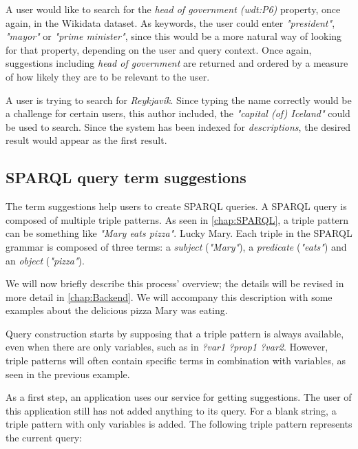 \begin{example}
A user would like to search for the \textit{head of government (wdt:P6)}  property, once again, in the Wikidata dataset. 
As keywords, the user could enter \textit{"president"}, \textit{"mayor"} or \textit{"prime minister"}, since this would be a more natural way of looking for that property, depending on the user and query context. Once again, suggestions including \textit{head of government} are returned and ordered by a measure of how likely they are to be relevant to the user.
\end{example}

\begin{example}
A user is trying to search for \textit{Reykjavík}. 
Since typing the name correctly would be a challenge for certain users, this author included, the \textit{"capital (of) Iceland"} could be used to search. 
Since the system has been indexed for \textit{descriptions}, the desired result would appear as the first result. 
\end{example}

\subsection{SPARQL query term suggestions}

The term suggestions help users to create SPARQL queries. 
A SPARQL query is composed of multiple triple patterns.
As seen in \autoref{chap:SPARQL}, a triple pattern can be something like \textit{"Mary eats pizza"}. 
Lucky Mary. 
Each triple in the SPARQL grammar is composed of three terms: 
a \textit{subject} (\textit{"Mary"}), 
a \textit{predicate} (\textit{"eats"}) 
and an \textit{object} (\textit{"pizza"}). 

We will now briefly describe this process' overview; the details will be revised in more detail in \autoref{chap:Backend}. 
We will accompany this description with some examples about the delicious pizza Mary was eating.

Query construction starts by supposing that a triple pattern is always available, even when there are only variables, such as in \textit{?var1 ?prop1 ?var2}. However, triple patterns will often contain specific terms in combination with variables, as seen in the previous example.

As a first step, an application uses our service for getting suggestions. 
The user of this application still has not added anything to its query. 
For a blank string, a triple pattern with only variables is added. 
The following triple pattern represents the current query:

